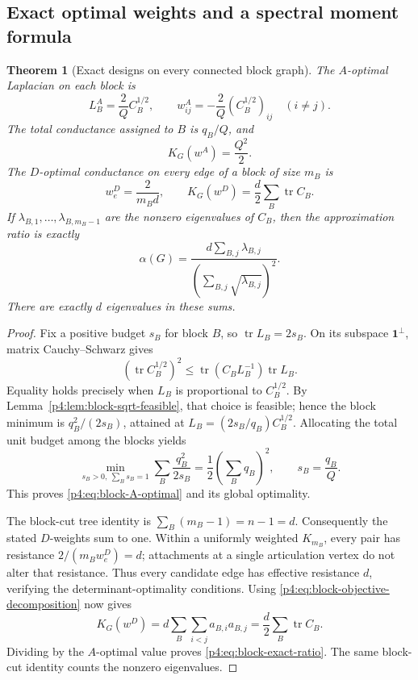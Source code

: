 \documentclass[11pt,a4paper]{article}
\newtheorem{theorem}{Theorem}[section]
\theoremstyle{definition}
\theoremstyle{remark}
\numberwithin{equation}{section}
\begin{document}
\subsection{Exact optimal weights and a spectral moment formula}

\begin{theorem}[Exact designs on every connected block graph]
\label{p4:thm:block-exact-designs}
The $A$-optimal Laplacian on each block is
\begin{equation}\label{p4:eq:block-A-optimal}
 L_B^A=\frac2Q C_B^{1/2},
 \qquad
 w_{ij}^A=-\frac2Q(C_B^{1/2})_{ij}\quad(i\ne j).
\end{equation}
The total conductance assigned to $B$ is $q_B/Q$, and
\[
 K_G(w^A)=\frac{Q^2}{2}.
\]
The $D$-optimal conductance on every edge of a block of size $m_B$ is
\[
 w_e^D=\frac{2}{m_Bd},
 \qquad
 K_G(w^D)=\frac d2\sum_B\operatorname{tr}C_B.
\]
If $\lambda_{B,1},\ldots,\lambda_{B,m_B-1}$ are the nonzero
eigenvalues of $C_B$, then the approximation ratio is exactly
\begin{equation}\label{p4:eq:block-exact-ratio}
 \alpha(G)=
 \frac{d\sum_{B,j}\lambda_{B,j}}
      {\left(\sum_{B,j}\sqrt{\lambda_{B,j}}\right)^2}.
\end{equation}
There are exactly $d$ eigenvalues in these sums.
\end{theorem}

\begin{proof}
Fix a positive budget $s_B$ for block $B$, so
$\operatorname{tr}L_B=2s_B$.
On its subspace $\mathbf1^\perp$, matrix Cauchy--Schwarz gives
\[
 (\operatorname{tr}C_B^{1/2})^2
 \leq\operatorname{tr}(C_BL_B^{-1})\operatorname{tr}L_B.
\]
Equality holds precisely when $L_B$ is proportional to $C_B^{1/2}$.
By Lemma~\ref{p4:lem:block-sqrt-feasible}, that choice is feasible;
hence the block minimum is $q_B^2/(2s_B)$, attained at
$L_B=(2s_B/q_B)C_B^{1/2}$.
Allocating the total unit budget among the blocks yields
\[
 \min_{s_B>0,\ \sum_Bs_B=1}
       \sum_B\frac{q_B^2}{2s_B}
 =\frac12\left(\sum_Bq_B\right)^2,
 \qquad s_B=\frac{q_B}{Q}.
\]
This proves \eqref{p4:eq:block-A-optimal} and its global optimality.

The block-cut tree identity is
$\sum_B(m_B-1)=n-1=d$.
Consequently the stated $D$-weights sum to one.
Within a uniformly weighted $K_{m_B}$, every pair has resistance
$2/(m_Bw_e^D)=d$; attachments at a single articulation vertex do not
alter that resistance.  Thus every candidate edge has effective
resistance $d$, verifying the determinant-optimality conditions.
Using \eqref{p4:eq:block-objective-decomposition} now gives
\[
 K_G(w^D)=d\sum_B\sum_{i<j}a_{B,i}a_{B,j}
        =\frac d2\sum_B\operatorname{tr}C_B.
\]
Dividing by the $A$-optimal value proves
\eqref{p4:eq:block-exact-ratio}.
The same block-cut identity counts the nonzero eigenvalues.
\end{proof}
\end{document}

